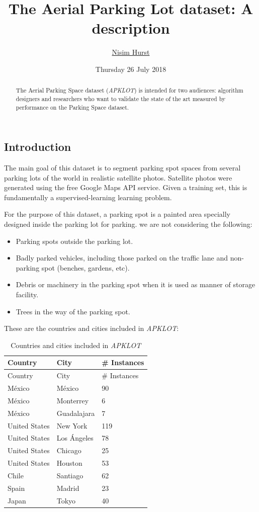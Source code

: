 \documentclass[]{article}
\title{The Aerial Parking Lot dataset: A description}
\author{\href{mailto:langheran@gmail.com}{Nisim Hurst}}
\date{Thursday 26 July 2018}
\providecommand{\tightlist}{%
  \setlength{\itemsep}{0pt}\setlength{\parskip}{0pt}}
\theoremstyle{definition}
\theoremstyle{definition}
\theoremstyle{definition}
\theoremstyle{remark}
\begin{document}
\maketitle
\begin{abstract}
The Aerial Parking Space dataset (\emph{APKLOT}) is intended for two
audiences: algorithm designers and researchers who want to validate the
state of the art measured by performance on the Parking Space dataset.
\end{abstract}

{
\hypersetup{linkcolor=black}
\setcounter{tocdepth}{5}
\tableofcontents
}
\hypertarget{introduction}{%
\subsection{Introduction}\label{introduction}}

The main goal of this dataset is to segment parking spot spaces from
several parking lots of the world in realistic satellite photos.
Satellite photos were generated using the free Google Maps API service.
Given a training set, this is fundamentally a supervised-learning
learning problem.

For the purpose of this dataset, a parking spot is a painted area
specially designed inside the parking lot for parking. we are not
considering the following:

\begin{itemize}
\tightlist
\item
  Parking spots outside the parking lot.
\item
  Badly parked vehicles, including those parked on the traffic lane and
  non-parking spot (benches, gardens, etc).
\item
  Debris or machinery in the parking spot when it is used as manner of
  storage facility.
\item
  Trees in the way of the parking spot.
\end{itemize}

These are the countries and cities included in \emph{APKLOT}:

\begin{longtable}[]{@{}lll@{}}
\caption{Countries and cities included in \emph{APKLOT}}\tabularnewline
\toprule
Country & City & \# Instances\tabularnewline
\midrule
\endfirsthead
\toprule
Country & City & \# Instances\tabularnewline
\midrule
\endhead
México & México & 90\tabularnewline
México & Monterrey & 6\tabularnewline
México & Guadalajara & 7\tabularnewline
United States & New York & 119\tabularnewline
United States & Los Ángeles & 78\tabularnewline
United States & Chicago & 25\tabularnewline
United States & Houston & 53\tabularnewline
Chile & Santiago & 62\tabularnewline
Spain & Madrid & 23\tabularnewline
Japan & Tokyo & 40\tabularnewline
\bottomrule
\end{longtable}
\end{document}
